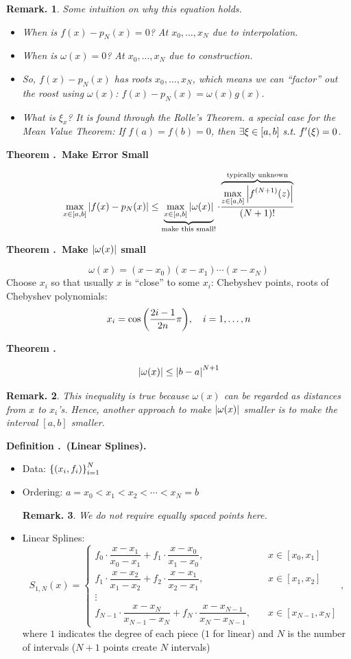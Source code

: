 \documentclass[12pt, a4paper]{article}
\newcounter{index}[subsection]
\newenvironment*{df}[1]{\par\noindent\textbf{Definition \thesubsection.\stepcounter{index}\theindex\ (#1).}}{\par}
\newenvironment*{thm}[1]{\begin{tcolorbox}\par\noindent\textbf{Theorem \thesubsection.\stepcounter{index}\theindex\ #1} \par}{\par\end{tcolorbox}}
\newtheorem{rmk}{Remark.}[section]
\def\st{\emph{\ s.t.\ }}
\begin{document}
\begin{rmk}
	Some intuition on why this equation holds. 
	\begin{itemize}
		\item When is $f(x)-p_N(x)=0$? At $x_0,\dots,x_N$ due to interpolation.
		\item When is $\omega(x)=0$? At $x_0,\dots,x_N$ due to construction.
		\item So, $f(x)-p_N(x)$ has roots $x_0,\dots,x_N$, which means we can ``factor'' out the roost using $\omega(x)$: $f(x)-p_N(x)=\omega(x)g(x)$.
		\item What is $\xi_x$? It is found through the Rolle's Theorem. a special case for the Mean Value Theorem: If $f(a)=f(b)=0$, then $\exists\xi\in[a,b]\st f'(\xi)=0$.
	\end{itemize}
\end{rmk}
\begin{thm}{Make Error Small}
	\[\max_{x\in[a,b]}\qty|f(x)-p_N(x)|\leq\underbrace{\max_{x\in[a,b]}\qty|\omega(x)|}_\text{make this small!}\cdot\dfrac{\overbrace{\max_{z\in[a,b]}\qty|f^{(N+1)}(z)|}^\text{typically unknown}}{(N+1)!}\]	
\end{thm}
\begin{thm}{Make $\qty|\omega(x)|$ small}
	\[\omega(x)=(x-x_0)(x-x_1)\cdots(x-x_N)\] Choose $x_i$ so that usually $x$ is ``close'' to some $x_i$: Chebyshev points, roots of Chebyshev polynomials: \[x_i=\cos\qty(\dfrac{2i-1}{2n}\pi),\quad i=1,\dots,n\]
\end{thm}
\begin{thm}{}
	\[\qty|\omega(x)|\leq\qty|b-a|^{N+1}\]
	\begin{rmk}This inequality is true because $\omega(x)$ can be regarded as distances from $x$ to $x_i$'s. Hence, another approach to make $\qty|\omega(x)|$ smaller is to make the interval $[a,b]$ smaller. \end{rmk}
\end{thm}
\begin{df}{Linear Splines}
	\begin{itemize}
		\item Data: $\qty{(x_i,f_i)}_{i=1}^N$
		\item Ordering: $a=x_0<x_1<x_2<\cdots<x_N=b$
		\begin{rmk} We do not require equally spaced points here. \end{rmk}
		\item Linear Splines: \[S_{1,N}(x)=\begin{cases}f_0\cdot\dfrac{x-x_1}{x_0-x_1}+f_1\cdot\dfrac{x-x_0}{x_1-x_0},&\quad x\in[x_0,x_1]\\f_1\cdot\dfrac{x-x_2}{x_1-x_2}+f_2\cdot\dfrac{x-x_1}{x_2-x_1},&\quad x\in[x_1,x_2]\\\vdots\\f_{N-1}\cdot\dfrac{x-x_N}{x_{N-1}-x_N}+f_N\cdot\dfrac{x-x_{N-1}}{x_N-x_{N-1}},&\quad x\in[x_{N-1},x_N]\end{cases},\] where $1$ indicates the degree of each piece ($1$ for linear) and $N$ is the number of intervals ($N+1$ points create $N$ intervals)
	\end{itemize}	
\end{df}
\end{document}

